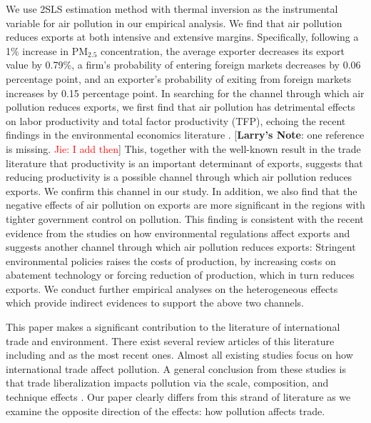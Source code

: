\documentclass[12pt]{article}
\begin{document}
We use 2SLS estimation method with thermal inversion as the instrumental
variable for air pollution in our empirical analysis. We find that air
pollution reduces exports at both intensive and extensive margins.
Specifically, following a 1\% increase in $\mathrm{PM_{2.5}}$ concentration,
the average exporter decreases its export value by 0.79\%, a firm's
probability of entering foreign markets decreases by 0.06 percentage point,
and an exporter's probability of exiting from foreign markets increases by
0.15 percentage point. In searching for the channel through which air
pollution reduces exports, we first find that air pollution has detrimental
effects on labor productivity and total factor productivity (TFP), echoing
the recent findings in the environmental economics literature %
\citep{NBERw18392,fu2021air,NBERw28401}. [\textbf{Larry's Note}:
one reference is missing. \textcolor{red}{Jie: I add then}] This, together with the well-known result in the
trade literature that productivity is an important determinant of exports,
suggests that reducing productivity is a possible channel through which air
pollution reduces exports. We confirm this channel in our study. In
addition, we also find that the negative effects of air pollution on exports
are more significant in the regions with tighter government control on
pollution. This finding is consistent with the recent evidence from the
studies on how environmental regulations affect exports \citep[e.g.,][]{
cherniwchan2022environmental} and suggests another channel through which air
pollution reduces exports: Stringent environmental policies raises the costs
of production, by increasing costs on abatement technology or forcing
reduction of production, which in turn reduces exports. We conduct further
empirical analyses on the heterogeneous effects which provide indirect
evidences to support the above two channels.

This paper makes a significant contribution to the literature of
international trade and environment. There exist several review articles of
this literature including \cite{cherniwchan2017trade} and \cite{NBERw30020}
as the most recent ones. Almost all existing studies focus on how
international trade affect pollution. A general conclusion from these
studies is that trade liberalization impacts pollution via the scale,
composition, and technique effects \citep{NBERw3914,copeland1994north}. Our
paper clearly differs from this strand of literature as we examine the
opposite direction of the effects: how pollution affects trade.
\end{document}
